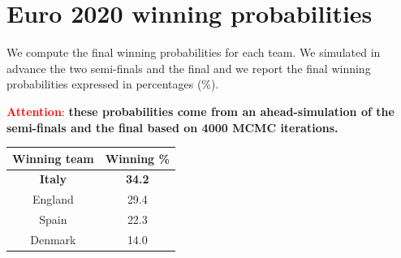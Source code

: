 \documentclass[
  10pt,
]{article}
\begin{document}
\hypertarget{euro-2020-winning-probabilities}{%
\section{Euro 2020 winning
probabilities}\label{euro-2020-winning-probabilities}}

We compute the final winning probabilities for each team. We simulated
in advance the two semi-finals and the final and we report the final
winning probabilities expressed in percentages (\%).

\textcolor{red}{\textbf{Attention}}: \textbf{these probabilities come from an ahead-simulation of the semi-finals and the final based on 4000 MCMC iterations.}

\begin{longtable}[]{@{}cc@{}}
\toprule
Winning team & Winning \%\tabularnewline
\midrule
\endhead
\textbf{Italy} & \textbf{34.2}\tabularnewline
England & 29.4\tabularnewline
Spain & 22.3\tabularnewline
Denmark & 14.0\tabularnewline
\bottomrule
\end{longtable}
\end{document}
